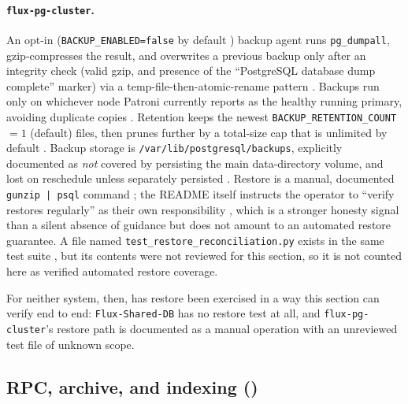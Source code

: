 \paragraph{\texttt{flux-\allowbreak{}pg-\allowbreak{}cluster}.} An opt-in (\texttt{BACKUP\_ENABLED=\allowbreak{}false} by
default ) backup agent runs \texttt{pg\_dumpall},
gzip-compresses the result, and overwrites a previous backup only after an integrity
check (valid gzip, and presence of the ``PostgreSQL database dump complete'' marker)
via a temp-file-then-atomic-rename pattern
. Backups run only on
whichever node Patroni currently reports as the healthy running primary, avoiding
duplicate copies
. Retention keeps the
newest \texttt{BACKUP\_RETENTION\_COUNT}$=1$ (default) files, then prunes further by a
total-size cap that is unlimited by default
. Backup storage is
\texttt{/\allowbreak{}var/\allowbreak{}lib/\allowbreak{}postgresql/\allowbreak{}backups}, explicitly documented as \emph{not} covered by
persisting the main data-directory volume, and lost on reschedule unless separately
persisted . Restore is a manual, documented
\texttt{gunzip~|~psql} command ; the README
itself instructs the operator to ``verify restores regularly'' as their own
responsibility , which is a stronger honesty
signal than a silent absence of guidance but does not amount to an automated restore
guarantee. A file named \texttt{test\_restore\_reconciliation.\allowbreak{}py} exists in the same
test suite ,
but its contents were not reviewed for this section, so it is not counted here as
verified automated restore coverage.

For neither system, then, has restore been exercised in a way this section can verify
end to end: \texttt{Flux-Shared-DB} has no restore test at all, and
\texttt{flux-\allowbreak{}pg-\allowbreak{}cluster}'s restore path is documented as a manual operation with an
unreviewed test file of unknown scope.

\subsection{RPC, archive, and indexing (\planned)}
\label{subsec:rpc-archive-indexing}

